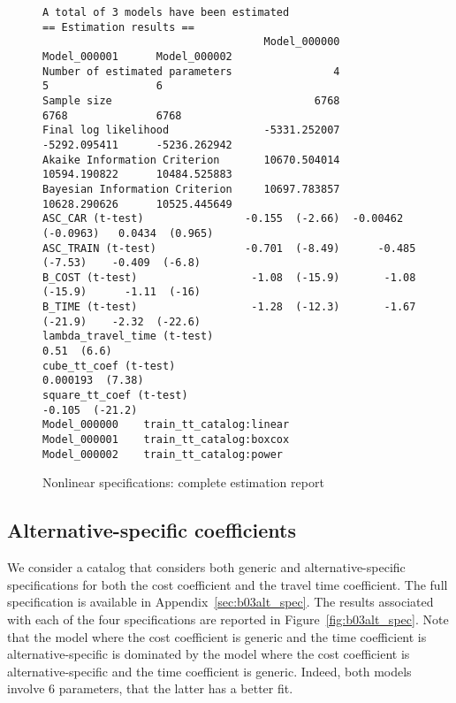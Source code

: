\documentclass[12pt,a4paper]{article}
\begin{document}
\begin{landscape}
  \begin{figure}[p]
\begin{lstlisting}
A total of 3 models have been estimated
== Estimation results ==
                                   Model_000000         Model_000001      Model_000002
Number of estimated parameters                4                    5                 6
Sample size                                6768                 6768              6768
Final log likelihood               -5331.252007         -5292.095411      -5236.262942
Akaike Information Criterion       10670.504014         10594.190822      10484.525883
Bayesian Information Criterion     10697.783857         10628.290626      10525.445649
ASC_CAR (t-test)                -0.155  (-2.66)  -0.00462  (-0.0963)   0.0434  (0.965)
ASC_TRAIN (t-test)              -0.701  (-8.49)      -0.485  (-7.53)    -0.409  (-6.8)
B_COST (t-test)                  -1.08  (-15.9)       -1.08  (-15.9)      -1.11  (-16)
B_TIME (t-test)                  -1.28  (-12.3)       -1.67  (-21.9)    -2.32  (-22.6)
lambda_travel_time (t-test)                              0.51  (6.6)
cube_tt_coef (t-test)                                                 0.000193  (7.38)
square_tt_coef (t-test)                                                -0.105  (-21.2)
Model_000000	train_tt_catalog:linear
Model_000001	train_tt_catalog:boxcox
Model_000002	train_tt_catalog:power
\end{lstlisting}
\caption{\label{fig:b02nonlinear}Nonlinear specifications: complete estimation report}
  \end{figure}
\end{landscape}

\subsection{Alternative-specific coefficients}

We consider a catalog that considers both generic and alternative-specific specifications for both the cost coefficient and the travel time coefficient.  The
full specification is available in
Appendix~\ref{sec:b03alt_spec}. The results associated with each of
the four specifications are reported in
Figure~\vref{fig:b03alt_spec}. Note that the model where the cost coefficient is generic and the time coefficient is alternative-specific is dominated by the model where the cost coefficient is alternative-specific and the time coefficient is generic. Indeed, both models involve 6 parameters, that the latter has a better fit.
\end{document}
